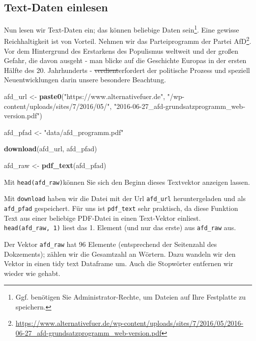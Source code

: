 \documentclass[12pt,ngerman,]{book}
\makeatletter
\newenvironment{Shaded}{\begin{snugshade}}{\end{snugshade}}
\newcommand{\KeywordTok}[1]{\textcolor[rgb]{0.13,0.29,0.53}{\textbf{{#1}}}}
\newcommand{\StringTok}[1]{\textcolor[rgb]{0.31,0.60,0.02}{{#1}}}
\newcommand{\NormalTok}[1]{{#1}}
\let\rmarkdownfootnote\footnote%
\def\footnote{\protect\rmarkdownfootnote}
\newenvironment{kframe}{%
\medskip{}
\setlength{\fboxsep}{.8em}
 \def\at@end@of@kframe{}%
 \ifinner\ifhmode%
  \def\at@end@of@kframe{\end{minipage}}%
  \begin{minipage}{\columnwidth}%
 \fi\fi%
 \def\FrameCommand##1{\hskip\@totalleftmargin \hskip-\fboxsep
 \colorbox{shadecolor}{##1}\hskip-\fboxsep
     \hskip-\linewidth \hskip-\@totalleftmargin \hskip\columnwidth}%
 \MakeFramed {\advance\hsize-\width
   \@totalleftmargin\z@ \linewidth\hsize
   \@setminipage}}%
 {\par\unskip\endMakeFramed%
 \at@end@of@kframe}
\renewenvironment{Shaded}{\begin{kframe}}{\end{kframe}}
\theoremstyle{definition}
\theoremstyle{definition}
\theoremstyle{remark}
\makeatother
\begin{document}
\subsection{Text-Daten einlesen}\label{text-daten-einlesen}

Nun lesen wir Text-Daten ein; das können beliebige Daten sein\footnote{Ggf.
  benötigen Sie Administrator-Rechte, um Dateien auf Ihre Festplatte zu
  speichern.}. Eine gewisse Reichhaltigkeit ist von Vorteil. Nehmen wir
das Parteiprogramm der Partei AfD\footnote{\url{https://www.alternativefuer.de/wp-content/uploads/sites/7/2016/05/2016-06-27_afd-grundsatzprogramm_web-version.pdf}}.
Vor dem Hintergrund des Erstarkens des Populismus weltweit und der
großen Gefahr, die davon ausgeht - man blicke auf die Geschichte Europas
in der ersten Hälfte des 20. Jahrhunderts - \sout{verdient}erfordert der
politische Prozess und speziell Neuentwicklungen darin unsere besondere
Beachtung.

\begin{Shaded}
\begin{Highlighting}[]
\NormalTok{afd_url <-}\StringTok{ }\KeywordTok{paste0}\NormalTok{(}\StringTok{"https://www.alternativefuer.de"}\NormalTok{,}
\StringTok{"/wp-content/uploads/sites/7/2016/05/"}\NormalTok{,}
\StringTok{"2016-06-27_afd-grundsatzprogramm_web-version.pdf"}\NormalTok{)}

\NormalTok{afd_pfad <-}\StringTok{ "data/afd_programm.pdf"}

\KeywordTok{download}\NormalTok{(afd_url, afd_pfad)}

\NormalTok{afd_raw <-}\StringTok{ }\KeywordTok{pdf_text}\NormalTok{(afd_pfad)}
\end{Highlighting}
\end{Shaded}

Mit \texttt{head(afd\_raw)}können Sie sich den Beginn dieses Textvektor
anzeigen lassen.

Mit \texttt{download} haben wir die Datei mit der Url \texttt{afd\_url}
heruntergeladen und als \texttt{afd\_pfad} gespeichert. Für uns ist
\texttt{pdf\_text} sehr praktisch, da diese Funktion Text aus einer
beliebige PDF-Datei in einen Text-Vektor einliest.
\texttt{head(afd\_raw,\ 1)} liest das 1. Element (und nur das erste) aus
\texttt{afd\_raw} aus.

Der Vektor \texttt{afd\_raw} hat 96 Elemente (entsprechend der
Seitenzahl des Dokzements); zählen wir die Gesamtzahl an Wörtern. Dazu
wandeln wir den Vektor in einen tidy text Dataframe um. Auch die
Stopwörter entfernen wir wieder wie gehabt.
\end{document}
